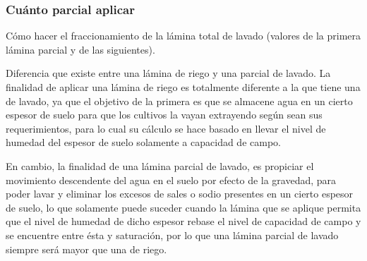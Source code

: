 \subsubsection{Cuánto parcial aplicar}
Cómo hacer el fraccionamiento de la lámina total de lavado (valores de la primera lámina parcial y de las siguientes).

Diferencia que existe entre una lámina de riego y una parcial de lavado. La finalidad de aplicar una lámina de riego es totalmente diferente a la que tiene una de lavado, ya que el objetivo de la primera es que se almacene agua en un cierto espesor de suelo para que los cultivos la vayan extrayendo según sean sus requerimientos, para lo cual su cálculo se hace basado en llevar el nivel de humedad del espesor de suelo solamente a capacidad de campo.

En cambio, la finalidad de una lámina parcial de lavado, es propiciar el movimiento descendente del agua en el suelo por efecto de la gravedad, para poder lavar y eliminar los excesos de sales o sodio presentes en un cierto espesor de suelo, lo que solamente puede suceder cuando la lámina que se aplique permita que el nivel de humedad de dicho espesor rebase el nivel de capacidad de campo y se encuentre entre ésta y saturación, por lo que una lámina parcial de lavado siempre será mayor que una de riego.

